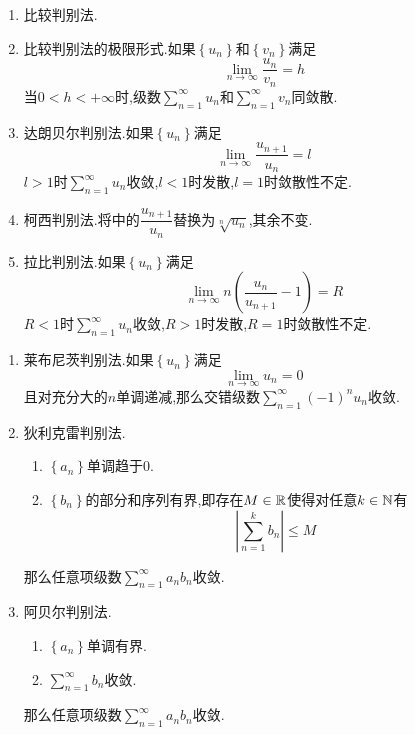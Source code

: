 \documentclass{ctexart}
\begin{document}
\pagestyle{empty}
\begin{center}\Large{}\end{center}
\begin{theorem}[判断正项级数收敛的方法]
    \begin{enumerate}[label=\tbf{(\arabic*)},topsep=0pt,parsep=0pt,itemsep=0pt,partopsep=0pt]
        \item 比较判别法.
        \item 比较判别法的极限形式.如果$\left\{u_n\right\}$和$\left\{v_n\right\}$满足
            \[\lim_{n\to\infty}\dfrac{u_n}{v_n}=h\]
            当$0<h<+\infty$时,级数$\displaystyle\sum_{n=1}^{\infty}u_n$和$\displaystyle\sum_{n=1}^{\infty}v_n$同敛散.
        \item 达朗贝尔判别法.如果$\left\{u_n\right\}$满足
            \[\lim_{n\to\infty}\dfrac{u_{n+1}}{u_n}=l\]
            $l>1$时$\displaystyle\sum_{n=1}^{\infty}u_n$收敛,$l<1$时发散,$l=1$时敛散性不定.
        \item 柯西判别法.将中的$\dfrac{u_{n+1}}{u_n}$替换为$\sqrt[n]{u_n}$,其余不变.
        \item 拉比判别法.如果$\left\{u_n\right\}$满足
            \[\lim_{n\to\infty}n\left(\dfrac{u_n}{u_{n+1}}-1\right)=R\]
            $R<1$时$\displaystyle\sum_{n=1}^{\infty}u_n$收敛,$R>1$时发散,$R=1$时敛散性不定.
    \end{enumerate}
\end{theorem}
\begin{theorem}[判断任意项级数收敛的方法]
    \begin{enumerate}[label=\tbf{(\arabic*)},topsep=0pt,parsep=0pt,itemsep=0pt,partopsep=0pt]
        \item 莱布尼茨判别法.如果$\left\{u_n\right\}$满足
            \[\lim_{n\to\infty}u_n=0\]
            且对充分大的$n$单调递减,那么交错级数$\displaystyle\sum_{n=1}^{\infty}(-1)^nu_n$收敛.
        \item 狄利克雷判别法.
            \begin{enumerate}[label=\tbf{\roman*.},topsep=0pt,parsep=0pt,itemsep=0pt,partopsep=0pt]
                \item $\left\{a_n\right\}$单调趋于$0$.
                \item $\left\{b_n\right\}$的部分和序列有界,即存在$M\in\mathbb{R}$使得对任意$k\in\mathbb{N}$有
                    \[\left|\sum_{n=1}^{k}b_n\right|\leqslant M\]
            \end{enumerate}
            那么任意项级数$\displaystyle\sum_{n=1}^{\infty}a_nb_n$收敛.
        \item 阿贝尔判别法.
            \begin{enumerate}[label=\tbf{\roman*.},topsep=0pt,parsep=0pt,itemsep=0pt,partopsep=0pt]
                \item $\left\{a_n\right\}$单调有界.
                \item $\displaystyle\sum_{n=1}^{\infty}b_n$收敛.
            \end{enumerate}
            那么任意项级数$\displaystyle\sum_{n=1}^{\infty}a_nb_n$收敛.
    \end{enumerate}
\end{theorem}
\end{document}
